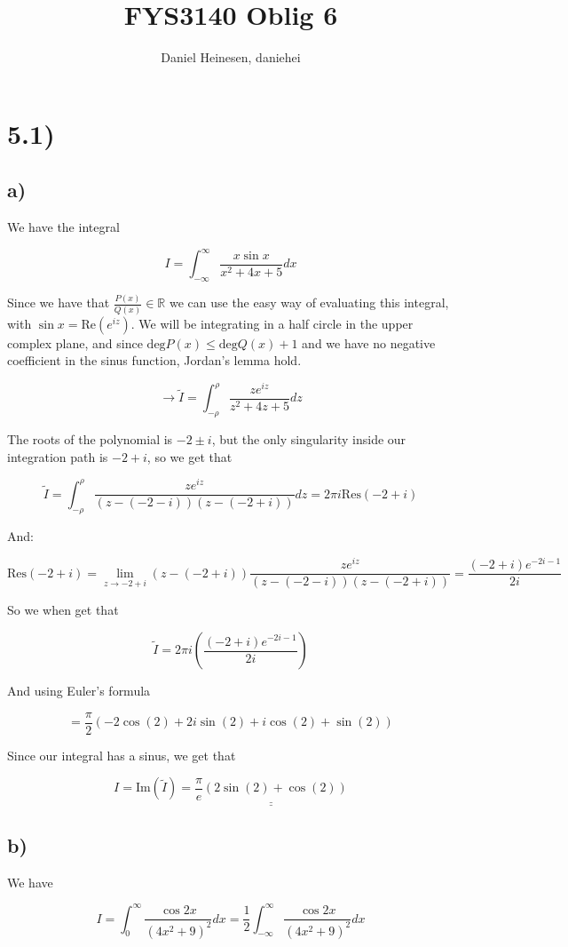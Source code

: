 \documentclass[a4paper,norsk, 10pt]{article}
\title{FYS3140 Oblig 6}
\author{Daniel Heinesen, daniehei}
\begin{document}
\maketitle
\section*{5.1)}
\subsection*{a)}
We have the integral

$$
I = \int_{-\infty}^{\infty}\frac{x\sin x}{x^2 + 4x +5} dx
$$

Since we have that $\frac{P(x)}{Q(x)} \in \mathbb{R}$ we can use the easy way of evaluating this integral, with $\sin x = \mathrm{Re}(e^{iz})$. We will be integrating in a half circle in the upper complex plane, and since $\mathrm{deg}P(x) \leq \mathrm{deg} Q(x) + 1$ and we have no negative coefficient in the sinus function, Jordan's lemma hold.

$$
\rightarrow \tilde{I} = \int_{-\rho}^{\rho} \frac{z e^{iz}}{z^2 + 4z +5} dz
$$

The roots of the polynomial is $-2 \pm i$, but the only singularity inside our integration path is $-2+i$, so we get that

$$
\tilde{I} = \int_{-\rho}^{\rho} \frac{z e^{iz}}{(z-(-2-i))(z-(-2+i))} dz = 2\pi i \mathrm{Res}(-2+i)
$$

And:

$$
\mathrm{Res}(-2+i) = \lim_{z \rightarrow -2+i} (z-(-2+i)) \frac{z e^{iz}}{(z-(-2-i))(z-(-2+i))} = \frac{(-2+i)e^{-2i-1}}{2i}
$$

So we when get that

$$
\tilde{I} = 2\pi i(\frac{(-2+i)e^{-2i-1}}{2i}) 
$$

And using Euler's formula

$$
= \frac{\pi}{2}(-2\cos(2) +2i\sin(2) + i\cos(2) + \sin(2))
$$

Since our integral has a sinus, we get that

$$
I = \mathrm{Im}(\tilde{I}) =\underline{\underline{ \frac{\pi}{e}(2\sin(2) + \cos(2))}}
$$

\subsection*{b)}

We have

$$
I = \int_0^{\infty} \frac{\cos 2x}{(4x^2 + 9)^2} dx = \frac{1}{2}\int_{-\infty}^{\infty} \frac{\cos 2x}{(4x^2 + 9)^2} dx 
$$
\end{document}
